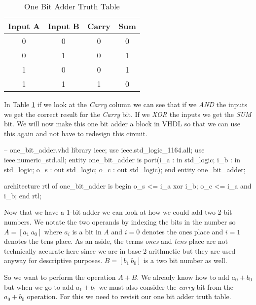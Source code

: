 \begin{table}[h!]  
\begin{center}    
\caption{One Bit Adder Truth Table} 
\label{tab:tt2ba} 
\begin{tabular}{|c|c|c|c|}  
\textbf{Input A} & \textbf{Input B} & \textbf{Carry} & \textbf{Sum}\\  
\hline  
0 & 0 & 0 & 0\\  
0 & 1 & 0 & 1\\  
1 & 0 & 0 & 1\\  
1 & 1 & 1 & 0\\ 
\end{tabular}  
\end{center}
\end{table}
	
In Table \ref{tab:tt2ba} if we look at the \emph{Carry} column we can see that if we \emph{AND} the inputs we get the correct result for the \emph{Carry} bit. If we \emph{XOR} the inputs we get the \emph{SUM} bit. We will now make this one bit adder a block in \ac{VHDL} so that we can use this again and not have to redesign this circuit.

\begin{VHDLlisting}[tabsize=4]
-- one_bit_adder.vhd
library ieee; 
	use ieee.std_logic_1164.all; 
	use ieee.numeric_std.all; 
entity one_bit_adder is
port(i_a : in    std_logic;  
     i_b : in    std_logic;  
	 o_s :   out std_logic;  
	 o_c :   out std_logic);
end entity one_bit_adder;

architecture rtl of one_bit_adder is
begin 
	o_s <= i_a xor i_b; 
	o_c <= i_a and i_b;
end rtl;
\end{VHDLlisting}

Now that we have a 1-bit adder we can look at how we could add two 2-bit numbers. We notate the two operands by indexing the bits in the number so $A=[a_1~a_0]$ where $a_i$ is a bit in $A$ and $i=0$ denotes the ones place and $i=1$ denotes the tens place. As an aside, the terms \emph{ones} and \emph{tens} place are not technically accurate here since we are in base-2 arithmetic but they are used anyway for descriptive purposes. $B=[b_1~b_0]$ is a two bit number as well.

So we want to perform the operation $A+B$. We already know how to add $a_0+b_0$ but when we go to add $a_1+b_1$ we must also consider the \emph{carry} bit from the $a_0+b_0$ operation. For this we need to revisit our one bit adder truth table.

